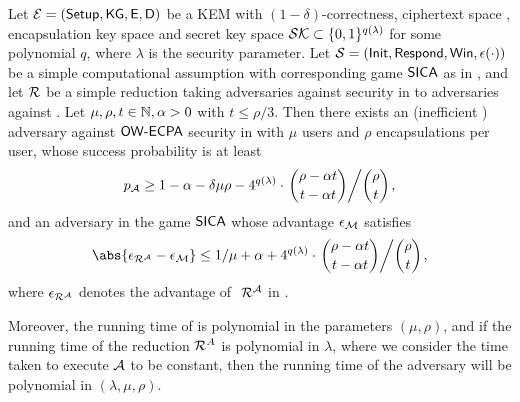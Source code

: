 \begin{remark}
\end{remark}

\begin{theorem}\label{thm:owecpa}
  Let \(\mathcal{E} = (\mathsf{Setup}, \mathsf{KG}, \mathsf{E}, \mathsf{D})\) be a KEM
  with \((1-\delta)\)-correctness,
  ciphertext space \setC, encapsulation key space \keyspace
  and secret key space \(\mathcal{SK} \subset \{0,1\}^{q(\lambda)}\) for some polynomial \(q\),
  where \(\lambda\) is the security parameter.
  Let \(\mathcal{S} = (\mathsf{Init}, \mathsf{Respond}, \mathsf{Win},\epsilon(\cdot))\) be a simple computational assumption
  with corresponding game \(\mathsf{SICA}\) as in ,
  and let \(\redR\) be a simple reduction
  taking adversaries against \OWECPA security in \KEM to adversaries against \SICA.
  Let \(\mu,\rho,t \in \mathbb{N}, \alpha > 0\) with \(t \le \rho/3\).
  Then there exists an (inefficient ) adversary \advA against \(\mathsf{OW}\text{-}\mathsf{ECPA}\) security in \KEM
  with \(\mu\) users and \(\rho\) encapsulations per user,
  whose success probability is at least
  \begin{equation}\label{ineq:A}
    p_{\advA} \ge 1 - \alpha - \delta \mu \rho
    - 4^{q(\lambda)} \cdot \left. \binom{\rho - \alpha t}{t - \alpha t} \middle/ \binom{\rho}{t} \right.,
  \end{equation}
  and an adversary \redM in the game \(\mathsf{SICA}\) whose advantage \(\epsilon_{\mathcal{M}}\) satisfies
  \begin{equation}\label{ineq:M}
    \abs{\epsilon_{\redR^{\advA}} - \epsilon_{\redM}} \le 1/\mu + \alpha
    + 4^{q(\lambda)} \cdot \left. \binom{\rho - \alpha t}{t - \alpha t} \middle/ \binom{\rho}{t} \right.,
  \end{equation}
  where \(\epsilon_{\redR^{\advA}}\) denotes the advantage of \(\text{ }\redR^{\advA}\) in \SICA.

  Moreover, the running time of \redM is polynomial in the parameters \((\mu, \rho)\),
  and if the running time of the reduction \(\redR^{A}\) is polynomial in \(\lambda\),
  where we consider the time taken to execute \(\mathcal{A}\) to be constant,
  then the running time of the adversary \redM will be polynomial in \((\lambda,\mu,\rho)\).
\end{theorem}

\begin{corollary}
\end{corollary}

